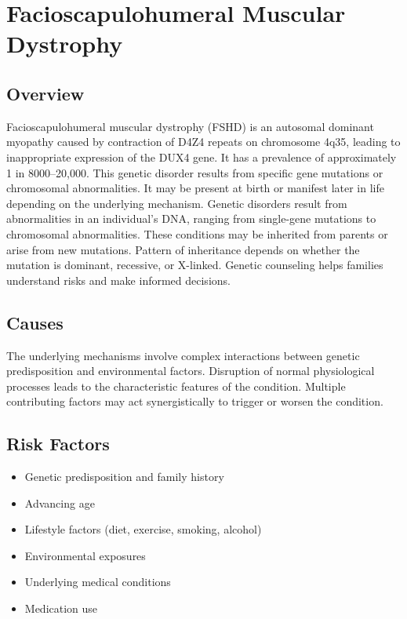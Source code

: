 \chapter{Facioscapulohumeral Muscular Dystrophy}
\label{sec:Facioscapulohumeral Muscular Dystrophy}

\section{Overview}
Facioscapulohumeral muscular dystrophy (FSHD) is an autosomal dominant myopathy caused by contraction of D4Z4 repeats on chromosome 4q35, leading to inappropriate expression of the DUX4 gene. It has a prevalence of approximately 1 in 8000--20,000. This genetic disorder results from specific gene mutations or chromosomal abnormalities. It may be present at birth or manifest later in life depending on the underlying mechanism. Genetic disorders result from abnormalities in an individual's DNA, ranging from single-gene mutations to chromosomal abnormalities. These conditions may be inherited from parents or arise from new mutations. Pattern of inheritance depends on whether the mutation is dominant, recessive, or X-linked. Genetic counseling helps families understand risks and make informed decisions.
\section{Causes}
The underlying mechanisms involve complex interactions between genetic predisposition and environmental factors. Disruption of normal physiological processes leads to the characteristic features of the condition. Multiple contributing factors may act synergistically to trigger or worsen the condition.
\section{Risk Factors}


\begin{itemize}[noitemsep]
  \item Genetic predisposition and family history
  \item Advancing age
  \item Lifestyle factors (diet, exercise, smoking, alcohol)
  \item Environmental exposures
  \item Underlying medical conditions
  \item Medication use
\end{itemize}
